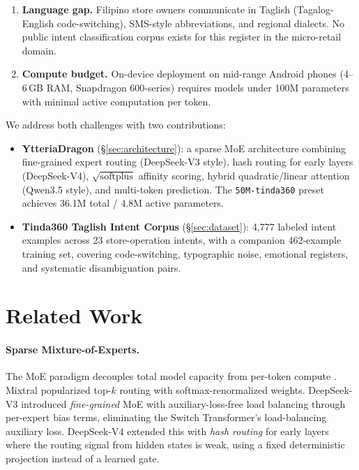 \documentclass[11pt,a4paper]{article}
\begin{document}
\begin{enumerate}[leftmargin=*]
  \item \textbf{Language gap.} Filipino store owners communicate in Taglish
    (Tagalog-English code-switching), SMS-style abbreviations, and regional
    dialects. No public intent classification corpus exists for this register
    in the micro-retail domain.
  \item \textbf{Compute budget.} On-device deployment on mid-range Android
    phones (4--6\,GB RAM, Snapdragon 600-series) requires models under 100M
    parameters with minimal active computation per token.
\end{enumerate}

We address both challenges with two contributions:

\begin{itemize}[leftmargin=*]
  \item \textbf{YtteriaDragon} (\S\ref{sec:architecture}): a sparse MoE
    architecture combining fine-grained expert routing (DeepSeek-V3 style),
    hash routing for early layers (DeepSeek-V4), $\sqrt{\mathrm{softplus}}$
    affinity scoring, hybrid quadratic/linear attention (Qwen3.5 style), and
    multi-token prediction. The \texttt{50M-tinda360} preset achieves 36.1M
    total / 4.8M active parameters.
  \item \textbf{Tinda360 Taglish Intent Corpus} (\S\ref{sec:dataset}): 4{,}777
    labeled intent examples across 23 store-operation intents, with a companion
    462-example training set, covering code-switching, typographic noise,
    emotional registers, and systematic disambiguation pairs.
\end{itemize}

\section{Related Work}
\label{sec:related}

\paragraph{Sparse Mixture-of-Experts.}
The MoE paradigm decouples total model capacity from per-token compute
\citep{shazeer2017outrageously}. Mixtral \citep{jiang2024mixtral} popularized
top-$k$ routing with softmax-renormalized weights. DeepSeek-V3
\citep{deepseekai2024deepseekv3} introduced \emph{fine-grained} MoE with
auxiliary-loss-free load balancing through per-expert bias terms, eliminating
the Switch Transformer's load-balancing auxiliary loss. DeepSeek-V4 extended
this with \emph{hash routing} for early layers where the routing signal from
hidden states is weak, using a fixed deterministic projection instead of a
learned gate.
\end{document}
